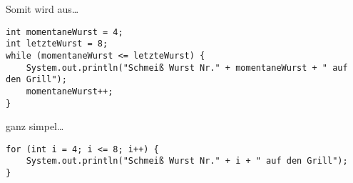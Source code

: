 \documentclass{../../presentation}
\begin{document}
\begin{frame}[fragile]
  Somit wird aus\dots

  \begin{verbatim}
int momentaneWurst = 4;
int letzteWurst = 8;
while (momentaneWurst <= letzteWurst) {
    System.out.println("Schmeiß Wurst Nr." + momentaneWurst + " auf den Grill");
    momentaneWurst++;
}
  \end{verbatim}
  ganz simpel\dots
  \begin{verbatim}
for (int i = 4; i <= 8; i++) {
    System.out.println("Schmeiß Wurst Nr." + i + " auf den Grill");
}
  \end{verbatim}

\end{frame}
\end{document}
